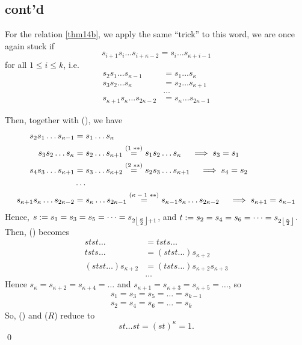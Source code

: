 \subsection{cont'd}

For the relation \eqref{thm14b}, we apply the same ``trick'' to this word,
we are once again stuck if
\[
    s_{i+1} s_i \dots s_{i+\kappa-2} = s_i \dots s_{\kappa+i-1}
\]
for all $1 \leq i \leq k$, i.e.
\begin{align*}
    s_2 s_1 \dots s_{\kappa-1} &= s_1 \dots s_{\kappa} \\
    s_3 s_2 \dots s_{\kappa} &= s_2 \dots s_{\kappa+1} \\
    & \dots \\
    s_{\kappa+1} s_{\kappa} \dots s_{2\kappa-2} &= s_{\kappa} \dots s_{2\kappa-1}
\end{align*}

Then, together with (\textasteriskcentered\textasteriskcentered), we have
\begin{align*}
    s_2 s_1 \dots s_{\kappa-1} &= s_1 \dots s_{\kappa} \\
    s_3 s_2 \dots s_{\kappa} &= s_2 \dots s_{\kappa+1}
        \overset{\text{(1 \textasteriskcentered\textasteriskcentered)}}{=} s_1 s_2 \dots s_{\kappa}
        \quad \implies s_3 = s_1 \\
    s_4 s_3 \dots s_{\kappa+1} &= s_3 \dots s_{\kappa+2}
        \overset{\text{(2 \textasteriskcentered\textasteriskcentered)}}{=}s_2 s_3 \dots s_{\kappa+1}
        \quad \implies s_4 = s_2 \\
    & \dots \\
    s_{\kappa+1} s_{\kappa} \dots s_{2\kappa-2} &= s_{\kappa} \dots s_{2\kappa-1}
    \overset{\text{($\kappa-1$ \textasteriskcentered\textasteriskcentered)}}{=} s_{\kappa-1} s_{\kappa} \dots s_{2\kappa-2}
        \quad \implies s_{\kappa+1} = s_{\kappa-1}
\end{align*}
Hence, $s := s_1 = s_3 = s_5 = \dots = s_{2\left\lfloor \frac{\kappa}{2} \right\rfloor+1}$,
and $t := s_2 = s_4 = s_6 = \dots = s_{2\left\lfloor \frac{\kappa}{2} \right\rfloor}$.
Then, (\textasteriskcentered\textasteriskcentered) becomes
\begin{align*}
    stst \dots &= tsts \dots \\
    tsts \dots &= (stst \dots) s_{\kappa+2} \\
    (stst \dots) s_{\kappa+2} &= (tsts \dots) s_{\kappa+2} s_{\kappa+3} \\
    & \dots
\end{align*}
Hence $s_\kappa = s_{\kappa+2} = s_{\kappa+4} = \dots$ and
$s_{\kappa+1} = s_{\kappa+3} = s_{\kappa+5} = \dots$, so
\begin{align*}
    s_1 = s_3 = s_5 = \dots = s_{k-1} \\
    s_2 = s_4 = s_6 = \dots = s_{k}
\end{align*}
So, (\textasteriskcentered\textasteriskcentered) and ($R$) reduce to
\[
    st \dots st = (st)^\kappa = 1.
\]
\qed

